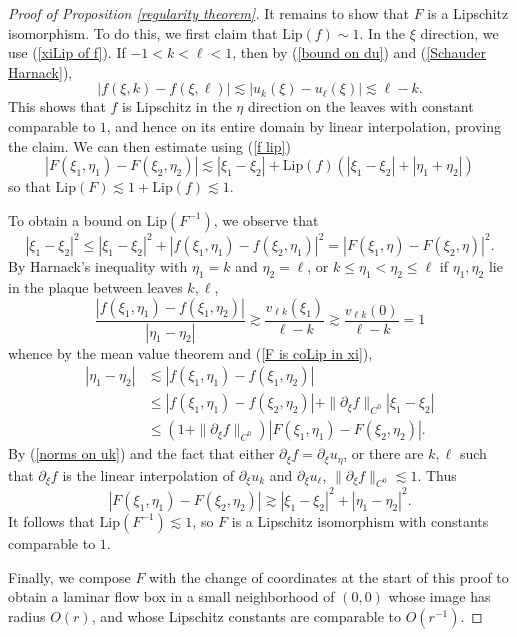 \documentclass[reqno,11pt]{amsart}
\newcommand{\Lip}{\mathrm{Lip}}
\theoremstyle{definition}
\numberwithin{equation}{section}
\begin{document}
\begin{proof}[Proof of Proposition \ref{regularity theorem}]
It remains to show that $F$ is a Lipschitz isomorphism.
To do this, we first claim that $\Lip(f) \sim 1$.
In the $\xi$ direction, we use (\ref{xiLip of f}).
If $-1 < k < \ell < 1$, then by (\ref{bound on du}) and (\ref{Schauder Harnack}),
\begin{equation}\label{f lip}
	|f(\xi, k) - f(\xi, \ell)| \lesssim |u_k(\xi) - u_\ell(\xi)| \lesssim \ell - k.
\end{equation}
This shows that $f$ is Lipschitz in the $\eta$ direction on the leaves with constant comparable to $1$, and hence on its entire domain by linear interpolation, proving the claim.
We can then estimate using (\ref{f lip})
$$|F(\xi_1, \eta_1) - F(\xi_2, \eta_2)| \lesssim |\xi_1 - \xi_2| + \Lip(f)(|\xi_1 - \xi_2| + |\eta_1 + \eta_2|)$$
so that $\Lip(F) \lesssim 1 + \Lip(f) \lesssim 1$.

To obtain a bound on $\Lip(F^{-1})$, we observe that
\begin{equation}\label{F is coLip in xi}
|\xi_1 - \xi_2|^2
\leq |\xi_1 - \xi_2|^2 + |f(\xi_1, \eta_1) - f(\xi_2, \eta_1)|^2 
= |F(\xi_1, \eta) - F(\xi_2, \eta)|^2.
\end{equation}
By Harnack's inequality with $\eta_1 = k$ and $\eta_2 = \ell$, or $k \leq \eta_1 < \eta_2 \leq \ell$ if $\eta_1, \eta_2$ lie in the plaque between leaves $k, \ell$,
$$\frac{|f(\xi_1, \eta_1) - f(\xi_1, \eta_2)|}{|\eta_1 - \eta_2|} \gtrsim \frac{v_{\ell k}(\xi_1)}{\ell - k} \gtrsim \frac{v_{\ell k}(0)}{\ell - k} = 1$$
whence by the mean value theorem and (\ref{F is coLip in xi}),
\begin{align*}
	|\eta_1 - \eta_2| 
	&\lesssim |f(\xi_1, \eta_1) - f(\xi_1, \eta_2)| \\
	&\leq |f(\xi_1, \eta_1) - f(\xi_2, \eta_2)| + \|\partial_\xi f\|_{C^0} |\xi_1 - \xi_2| \\
	&\leq (1 + \|\partial_\xi f\|_{C^0}) |F(\xi_1, \eta_1) - F(\xi_2, \eta_2)|.
\end{align*}
By (\ref{norms on uk}) and the fact that either $\partial_\xi f = \partial_\xi u_\eta$, or there are $k,\ell$ such that $\partial_\xi f$ is the linear interpolation of $\partial_\xi u_k$ and $\partial_\xi u_\ell$, $\|\partial_\xi f\|_{C^0} \lesssim 1$.
Thus
$$|F(\xi_1, \eta_1) - F(\xi_2, \eta_2)| \gtrsim |\xi_1 - \xi_2|^2 + |\eta_1 - \eta_2|^2.$$
It follows that $\Lip(F^{-1}) \lesssim 1$, so $F$ is a Lipschitz isomorphism with constants comparable to $1$.

Finally, we compose $F$ with the change of coordinates at the start of this proof to obtain a laminar flow box in a small neighborhood of $(0, 0)$ whose image has radius $O(r)$, and whose Lipschitz constants are comparable to $O(r^{-1})$.
\end{proof}
\end{document}
